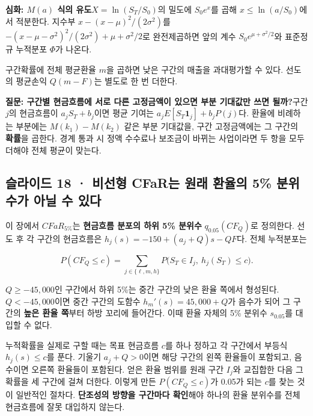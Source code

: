 \documentclass[11pt,a4paper]{article}
\begin{document}
\par\medskip\noindent\textbf{심화: $M(a)$ 식의 유도}\quad $X=\ln(S_T/S_0)$의 밀도에 $S_0e^x$를 곱해 $x\leq\ln(a/S_0)$에서 적분한다. 지수부 $x-(x-\mu)^2/(2\sigma^2)$를 $-(x-\mu-\sigma^2)^2/(2\sigma^2)+\mu+\sigma^2/2$로 완전제곱하면 앞의 계수 $S_0e^{\mu+\sigma^2/2}$와 표준정규 누적분포 $\Phi$가 나온다.\par

구간확률에 전체 평균환율 $m$을 곱하면 낮은 구간의 매출을 과대평가할 수 있다. 선도의 평균손익 $Q(m-F)$는 별도로 한 번 더한다.\par

\par\medskip\noindent\textbf{질문: 구간별 현금흐름에 서로 다른 고정금액이 있으면 부분 기대값만 쓰면 될까?}\quad 구간 $j$의 현금흐름이 $a_jS_T+b_j$이면 평균 기여는 $a_jE[S_T\mathbf1_j]+b_jP(j)$다. 환율에 비례하는 부분에는 $M(k_1)-M(k_2)$ 같은 부분 기대값을, 구간 고정금액에는 그 구간의 \textbf{확률}을 곱한다. 경계 통과 시 정액 수수료나 보조금이 바뀌는 사업이라면 두 항을 모두 더해야 전체 평균이 맞는다.\par

\subsection{슬라이드 18 · 비선형 CFaR는 원래 환율의 5\% 분위수가 아닐 수 있다}
이 장에서 $CFaR_{5\%}$는 \textbf{현금흐름 분포의 하위 5\% 분위수} $q_{0.05}(CF_Q)$로 정의한다. 선도 후 각 구간의 현금흐름은 $h_j(s)=-150+(a_j+Q)s-QF$다. 전체 누적분포는\par

\[
P(CF_Q\leq c)=\sum_{j\in\{\ell,m,h\}}
P\bigl(S_T\in I_j,\ h_j(S_T)\leq c\bigr).
\]

$Q\geq-45{,}000$인 구간에서 하위 5\%는 중간 구간의 낮은 환율 쪽에서 형성된다. $Q<-45{,}000$이면 중간 구간의 도함수 $h_m'(s)=45{,}000+Q$가 음수가 되어 그 구간의 \textbf{높은 환율 쪽}부터 하방 꼬리에 들어간다. 이때 환율 자체의 5\% 분위수 $s_{0.05}$를 대입할 수 없다.\par

누적확률을 실제로 구할 때는 목표 현금흐름 $c$를 하나 정하고 각 구간에서 부등식 $h_j(s)\leq c$를 푼다. 기울기 $a_j+Q>0$이면 해당 구간의 왼쪽 환율들이 포함되고, 음수이면 오른쪽 환율들이 포함된다. 얻은 환율 범위를 원래 구간 $I_j$와 교집합한 다음 그 확률을 세 구간에 걸쳐 더한다. 이렇게 만든 $P(CF_Q\leq c)$가 0.05가 되는 $c$를 찾는 것이 일반적인 절차다. \textbf{단조성의 방향을 구간마다 확인}해야 하나의 환율 분위수를 전체 현금흐름에 잘못 대입하지 않는다.\par
\end{document}
